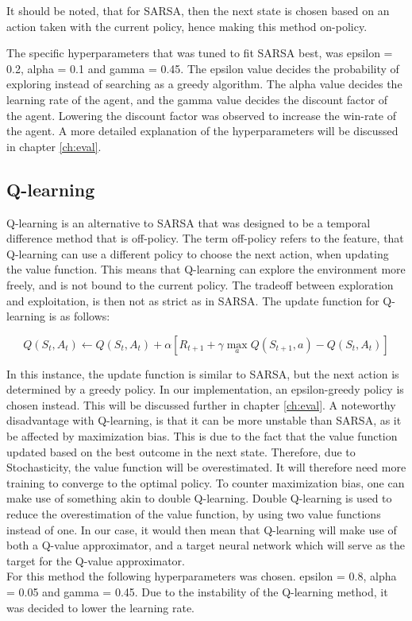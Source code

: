It should be noted, that for SARSA, then the next state is chosen based on an action taken with the current policy, hence making this method on-policy.

The specific hyperparameters that was tuned to fit SARSA best, was epsilon = 0.2, alpha = 0.1 and gamma = 0.45. The epsilon value decides the probability of exploring instead of searching as a greedy algorithm. The alpha value decides the learning rate of the agent, and the gamma value decides the discount factor of the agent. Lowering the discount factor was observed to increase the win-rate of the agent. A more detailed explanation of the hyperparameters will be discussed in chapter \ref{ch:eval}.

\subsection{Q-learning} \label{sec:Q-learning}
Q-learning is an alternative to SARSA that was designed to be a temporal difference method that is off-policy. The term off-policy refers to the feature, that Q-learning can use a different policy to choose the next action, when updating the value function. This means that Q-learning can explore the environment more freely, and is not bound to the current policy. The tradeoff between exploration and exploitation, is then not as strict as in SARSA. The update function for Q-learning is as follows:

\begin{equation}
    Q(S_t, A_t) \leftarrow Q(S_t, A_t) + \alpha \left[ R_{t+1} + \gamma \max_a Q(S_{t+1}, a) - Q(S_t, A_t) \right]
\end{equation}

In this instance, the update function is similar to SARSA, but the next action is determined by a greedy policy. In our implementation, an epsilon-greedy policy is chosen instead. This will be discussed further in chapter \ref{ch:eval}. A noteworthy disadvantage with Q-learning, is that it can be more unstable than SARSA, as it be affected by maximization bias. This is due to the fact that the value function updated based on the best outcome in the next state. Therefore, due to Stochasticity, the value function will be overestimated. It will therefore need more training to converge to the optimal policy. To counter maximization bias, one can make use of something akin to double Q-learning. Double Q-learning is used to reduce the overestimation of the value function, by using two value functions instead of one. In our case, it would then mean that Q-learning will make use of both a Q-value approximator, and a target neural network which will serve as the target for the Q-value approximator.\\
For this method the following hyperparameters was chosen. epsilon = 0.8, alpha = 0.05 and gamma = 0.45. Due to the instability of the Q-learning method, it was decided to lower the learning rate. 



